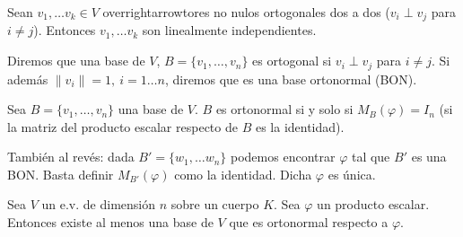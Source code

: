 \documentclass[14pt]{book}
\begin{document}
\begin{tm}
	Sean $v_1, \dots v_k \in V$ overrightarrowtores no nulos ortogonales dos a dos ($v_i \perp v_j$ para $i≠j$). Entonces $v_1, \dots v_k$ son linealmente independientes.
\end{tm}

\begin{dfn}
	Diremos que una base de $V$, $B = \{v_1, \dots, v_n\}$ es ortogonal si $v_i \perp v_j$ para $i≠j$. Si además $\lVert v_i \rVert = 1,\ i = 1 \dots n$, diremos que es una base ortonormal (BON).
\end{dfn}

\begin{tm}
	Sea $B = \{v_1, \dots, v_n\}$ una base de $V$. $B$ es ortonormal si y solo si $M_B (\varphi) = I_n$ (si la matriz del producto escalar respecto de $B$ es la identidad).
	
	También al revés: dada $B' = \{w_1, \dots w_n\}$ podemos encontrar $\varphi$ tal que $B'$ es una BON. Basta definir $M_{B'}(\varphi)$ como la identidad. Dicha $\varphi$ es única.
\end{tm}

\begin{tm}
	Sea $V$ un e.v. de dimensión $n$ sobre un cuerpo $K$. Sea $\varphi$ un producto escalar. Entonces existe al menos una base de $V$ que es ortonormal respecto a $\varphi$.
\end{tm}
\end{document}
